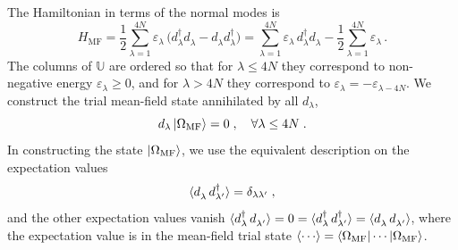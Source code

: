 The Hamiltonian in terms of the normal modes is
\begin{equation}
    H_{\mathrm{MF}} =\frac{1}{2} \sum_{\lambda = 1}^{4 N} \varepsilon_\lambda \, \big(  d^\dagger_\lambda d_\lambda^{\phantom{\dagger}} - d_\lambda^{\phantom{\dagger}} d_\lambda^\dagger    \big) =  \sum_{\lambda = 1}^{4  {N}} \varepsilon_\lambda \,  d^\dagger_\lambda d_\lambda^{\phantom{\dagger}} - \frac{1}{2}\sum_{\lambda = 1}^{4  {N}} \varepsilon_\lambda\, .
\end{equation}
The columns of $\mathbb{U}$ are ordered so that for $ \lambda \leq 4 {N}$ they correspond to non-negative energy $\varepsilon_\lambda \geq 0$, and for $\lambda > 4 {N}$ they correspond to $\varepsilon_{\lambda} = - \varepsilon_{\lambda - 4  {N}}$.
We construct the trial mean-field state annihilated by all $d_\lambda$,
\begin{equation}
     d_{\lambda} \ket{\Omega_{\text{MF}}}=0\; , \quad \forall \lambda \leq 4  {N}  \; .
\end{equation}
In constructing the state $\ket{\Omega_{\text{MF}}}$, we use the equivalent description on the expectation values
\begin{equation}
    \braket{ d_\lambda^{\phantom{\dagger}} \, d_{\lambda'}^\dagger}=\delta_{\lambda\lambda'} \;,
\end{equation}
and the other expectation values vanish
$ \braket{ d_\lambda^\dagger \, d_{\lambda'}^{\phantom{\dagger}}}=0 = \braket{ d_\lambda^{{\dagger}} \, d_{\lambda'}^\dagger} = \braket{ d_\lambda^{\phantom{\dagger}} \, d_{\lambda'}^{\phantom{\dagger}} }$, where the expectation value is in the mean-field trial state $\braket{\cdots}=\bra{\Omega_{\text{MF}}}\cdots\ket{\Omega_{\text{MF}}}$.


